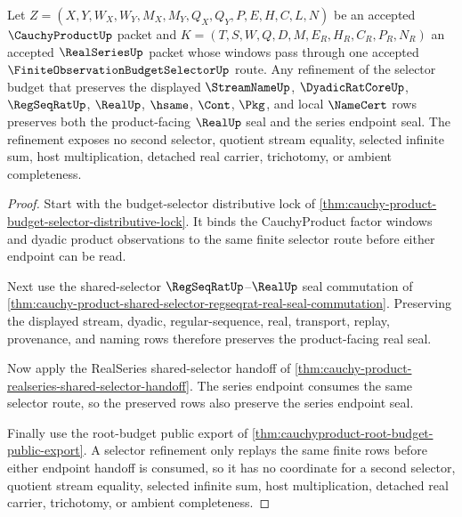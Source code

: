 \begin{theorem}
\label{thm:cauchy-product-realseries-selector-refinement-boundary}
Let $Z=(X,Y,W_X,W_Y,M_X,M_Y,Q_X,Q_Y,P,E,H,C,L,N)$ be an accepted $\CauchyProductUp$ packet and $K=(T,S,W,Q,D,M,E_R,H_R,C_R,P_R,N_R)$ an accepted $\RealSeriesUp$ packet whose windows pass through one accepted $\FiniteObservationBudgetSelectorUp$ route. Any refinement of the selector budget that preserves the displayed $\StreamNameUp$, $\DyadicRatCoreUp$, $\RegSeqRatUp$, $\RealUp$, $\hsame$, $\Cont$, $\Pkg$, and local $\NameCert$ rows preserves both the product-facing $\RealUp$ seal and the series endpoint seal. The refinement exposes no second selector, quotient stream equality, selected infinite sum, host multiplication, detached real carrier, trichotomy, or ambient completeness.
\end{theorem}
\begin{proof}
Start with the budget-selector distributive lock of \autoref{thm:cauchy-product-budget-selector-distributive-lock}. It binds the CauchyProduct factor windows and dyadic product observations to the same finite selector route before either endpoint can be read.

Next use the shared-selector $\RegSeqRatUp$--$\RealUp$ seal commutation of \autoref{thm:cauchy-product-shared-selector-regseqrat-real-seal-commutation}. Preserving the displayed stream, dyadic, regular-sequence, real, transport, replay, provenance, and naming rows therefore preserves the product-facing real seal.

Now apply the RealSeries shared-selector handoff of \autoref{thm:cauchy-product-realseries-shared-selector-handoff}. The series endpoint consumes the same selector route, so the preserved rows also preserve the series endpoint seal.

Finally use the root-budget public export of \autoref{thm:cauchyproduct-root-budget-public-export}. A selector refinement only replays the same finite rows before either endpoint handoff is consumed, so it has no coordinate for a second selector, quotient stream equality, selected infinite sum, host multiplication, detached real carrier, trichotomy, or ambient completeness.
\end{proof}
